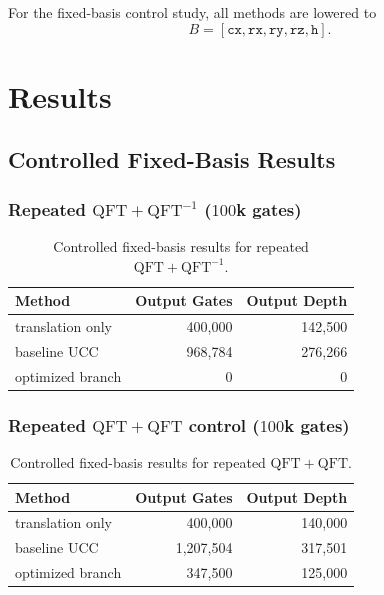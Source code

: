 \documentclass[11pt]{article}
\begin{document}
For the fixed-basis control study, all methods are lowered to
\[
B = [\texttt{cx}, \texttt{rx}, \texttt{ry}, \texttt{rz}, \texttt{h}].
\]

\section{Results}

\subsection{Controlled Fixed-Basis Results}

\subsubsection{Repeated $\mathrm{QFT}+\mathrm{QFT}^{-1}$ ($100$k gates)}

\begin{table}[h]
\centering
\begin{tabular}{lrr}
\toprule
Method & Output Gates & Output Depth \\
\midrule
translation only & 400{,}000 & 142{,}500 \\
baseline UCC & 968{,}784 & 276{,}266 \\
optimized branch & 0 & 0 \\
\bottomrule
\end{tabular}
\caption{Controlled fixed-basis results for repeated $\mathrm{QFT}+\mathrm{QFT}^{-1}$.}
\end{table}

\subsubsection{Repeated $\mathrm{QFT}+\mathrm{QFT}$ control ($100$k gates)}

\begin{table}[h]
\centering
\begin{tabular}{lrr}
\toprule
Method & Output Gates & Output Depth \\
\midrule
translation only & 400{,}000 & 140{,}000 \\
baseline UCC & 1{,}207{,}504 & 317{,}501 \\
optimized branch & 347{,}500 & 125{,}000 \\
\bottomrule
\end{tabular}
\caption{Controlled fixed-basis results for repeated $\mathrm{QFT}+\mathrm{QFT}$.}
\end{table}
\end{document}
